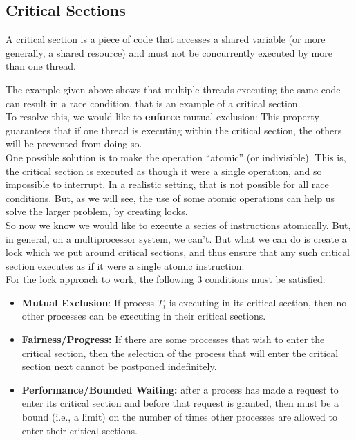 \documentclass[a4paper, 10pt]{article}
\begin{document}
\subsection{Critical Sections}
\begin{definitionbox}{}{}
    A critical section is a piece of code that accesses a shared variable (or more generally, a shared resource) and must not be concurrently executed by more than one thread.
\end{definitionbox}
\noindent The example given above  shows that multiple threads executing the same code can result in a race condition, that is an example of a critical section. \\
To resolve this, we would like to \textbf{enforce} mutual exclusion: This property
guarantees that if one thread is executing within the critical section, the others will be prevented from doing so. \\[2ex]
One possible solution is to make the operation “atomic” (or indivisible). This is, the critical section is executed as though it were a single operation, and so impossible to interrupt. In a realistic setting, that is not possible for all race conditions. But, as we will see, the use of some atomic operations can help us solve the larger problem, by creating locks. \\[2ex]
So now we know we would like to execute a series of instructions atomically. But, in general, on a multiprocessor system, we can't. But what we can do is create a lock which we put around critical sections, and thus ensure that any such critical section executes as if it were a single atomic instruction.\\[2ex]
For the lock approach to work, the following 3 conditions must be
satisfied:
\begin{itemize}
    \item \textbf{Mutual Exclusion}: If process $T_i$ is executing in its critical section, then no other processes can be executing in their critical sections.
    \item \textbf{Fairness/Progress:} If there are some processes that wish to enter the critical section, then the selection of the process that will enter the critical section next cannot be postponed indefinitely.
    \item \textbf{Performance/Bounded Waiting: }after a process has made a request
          to enter its critical section and before that request is granted, then
          must be a bound (i.e., a limit) on the number of times other
          processes are allowed to enter their critical sections.
\end{itemize}
\end{document}
